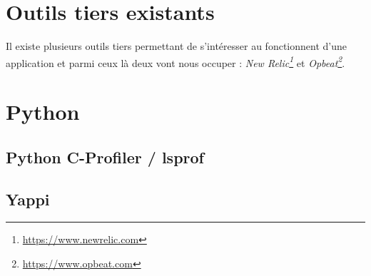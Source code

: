 		\section{Outils tiers existants}
Il existe plusieurs outils tiers permettant de s'intéresser au fonctionnent d'une application \Python et parmi ceux là deux vont nous occuper : \emph{New Relic\footnote{\url{https://www.newrelic.com}}} et \emph{Opbeat\footnote{\url{https://www.opbeat.com}}}.

			
		\section{Python}
			\subsection{Python C-Profiler / \textunderscore lsprof} 
			\label{subsec:cprofiler}
				
			\subsection{Yappi}
			\label{subsec:yappi}
				
				
				
				
				
				
				
				
				
				
				
				
				
				
				
				
				
				
				
				
				
				
				
				
				
				
				
				
				
				
				
				
				
				